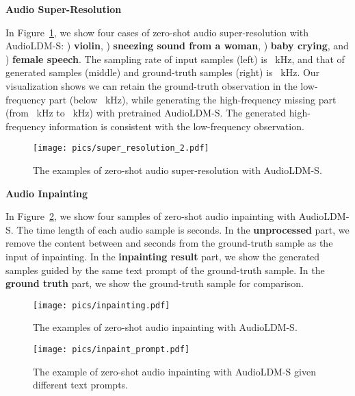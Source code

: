 \documentclass{article}
\begin{document}
\newpage

\textbf{Audio Super-Resolution}

In Figure~\ref{fig:demo-super-resolution}, we show four cases of zero-shot audio super-resolution with AudioLDM-S: ) \textbf{violin}, ) \textbf{sneezing sound from a woman}, ) \textbf{baby crying}, and ) \textbf{female speech}. The sampling rate of input samples (left) is ~kHz, and that of generated samples (middle) and ground-truth samples (right) is ~kHz. Our visualization shows we can retain the ground-truth observation in the low-frequency part (below ~kHz), while generating the high-frequency missing part (from ~kHz to ~kHz) with pretrained AudioLDM-S. The generated high-frequency information is consistent with the low-frequency observation.  

\vspace{0.5cm}

\begin{figure}[htbp]
    \centering
    \texttt{[image: pics/super\_resolution\_2.pdf]}
    \caption{The examples of zero-shot audio super-resolution with AudioLDM-S.}
    \label{fig:demo-super-resolution}
\end{figure}

\newpage

\textbf{Audio Inpainting}

In Figure~\ref{fig:demo-inpainting}, we show four samples of zero-shot audio inpainting with AudioLDM-S. The time length of each audio sample is  seconds. In the \textbf{unprocessed} part, we remove the content between  and  seconds from the ground-truth sample as the input of inpainting. In the \textbf{inpainting result} part, we show the generated samples guided by the same text prompt of the ground-truth sample. In the \textbf{ground truth} part, we show the ground-truth sample for comparison.

\vspace{0.5cm}

\begin{figure}[htbp]
    \centering
    \texttt{[image: pics/inpainting.pdf]}
    \caption{The examples of zero-shot audio inpainting with AudioLDM-S.}
    \label{fig:demo-inpainting}
\vspace{0.5cm}
\end{figure}

\begin{figure}[htbp]
    \centering
    \texttt{[image: pics/inpaint\_prompt.pdf]}
    \caption{The example of zero-shot audio inpainting with AudioLDM-S given different text prompts.}
    \label{fig:demo-inpainting-prompt}
\vspace{0.5cm}
\end{figure}
\end{document}
